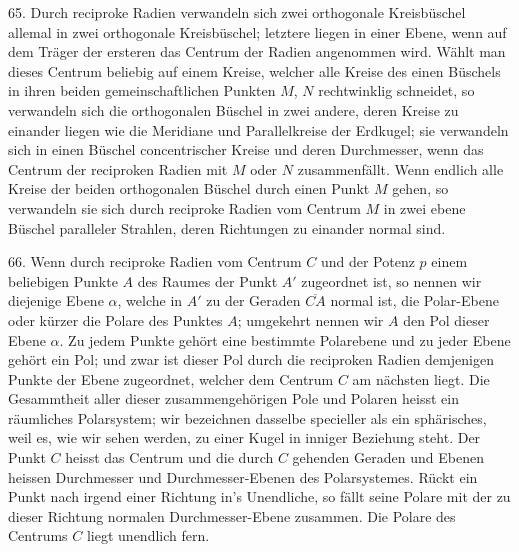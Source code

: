65. Durch reciproke Radien verwandeln sich zwei orthogonale
Kreis\-b\"uschel allemal in zwei orthogonale Kreisb\"uschel;
letztere liegen in einer Ebene, wenn auf dem Tr\"ager
der ersteren das Centrum der Radien angenommen wird.
W\"ahlt man dieses Centrum beliebig auf einem Kreise, welcher
alle Kreise des einen B\"uschels in ihren beiden gemeinschaftlichen
Punkten $M$, $N$ rechtwinklig schneidet, so verwandeln
sich die orthogonalen B\"uschel in zwei andere, deren
Kreise zu einander liegen wie die Meridiane und Parallelkreise
der Erdkugel; sie verwandeln sich in einen B\"uschel
concentrischer Kreise und deren Durchmesser, wenn das
Centrum der reciproken Radien mit $M$ oder $N$ zusammenf\"allt.
Wenn endlich alle Kreise der beiden orthogonalen
B\"uschel durch einen Punkt $M$ gehen, so verwandeln sie sich
durch reciproke Radien vom Centrum $M$ in zwei ebene B\"uschel
paralleler Strahlen, deren Richtungen zu einander normal
sind.

\begin{center}
\makebox[15em]{\hrulefill}
\end{center}


\label{p7}


\hspace{\parindent}%
66. Wenn durch reciproke Radien vom Centrum $C$ und
der Potenz $p$ einem beliebigen Punkte $A$ des Raumes der
Punkt $A'$ zugeordnet ist, so nennen wir diejenige Ebene $\alpha$,
welche in $A'$ zu der Geraden $\overline{CA}$ normal ist, die {\glqq}Polar-Ebene{\grqq}
oder k\"urzer die {\glqq}Polare{\grqq} des Punktes $A$; umgekehrt
nennen wir $A$ den {\glqq}Pol{\grqq} dieser Ebene $\alpha$. Zu jedem Punkte
geh\"ort eine bestimmte Polarebene und zu jeder Ebene geh\"ort
ein Pol; und zwar ist dieser Pol durch die reciproken Radien
demjenigen Punkte der Ebene zugeordnet, welcher dem
Centrum $C$ am n\"achsten liegt. Die Gesammtheit aller dieser
zusammengeh\"origen Pole und Polaren heisst ein {\glqq}r\"aumliches
Polarsystem{\grqq}; wir bezeichnen dasselbe specieller als ein
{\glqq}sph\"arisches{\grqq}, weil es, wie wir sehen werden, zu einer Kugel
in inniger Beziehung steht. Der Punkt $C$ heisst das Centrum
und die durch $C$ gehenden Geraden und Ebenen heissen
{\glqq}Durchmesser{\grqq} und {\glqq}Durchmesser-Ebenen{\grqq} des Polarsystemes.
R\"uckt ein Punkt nach irgend einer Richtung in's Unendliche,
so f\"allt seine Polare mit der zu dieser Richtung normalen
Durchmesser-Ebene zusammen. Die Polare des Centrums $C$
liegt unendlich fern.

